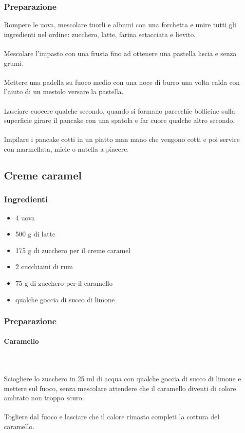 \documentclass[12pt, a4paper]{article}
\begin{document}
\subsubsection{Preparazione}
	Rompere le uova, mescolare tuorli e albumi con una forchetta e unire
	tutti gli ingredienti nel ordine: zucchero, latte, farina setacciata 
	e lievito.\\\\
	Mescolare l'impasto con una frusta fino ad ottenere una pastella
	liscia e senza grumi.\\\\
	Mettere una padella su fuoco medio con una noce di burro una volta
	calda con l'aiuto di un mestolo versare la pastella.\\\\
	Lasciare cuocere qualche secondo, quando si formano parecchie
	bollicine sulla superficie girare il pancake con una spatola
	e far cuore qualche altro secondo.\\\\
	Impilare i pancake cotti in un piatto man mano che vengono cotti e poi
	servire con marmellata, miele o nutella a piacere.
\clearpage

\subsection{Creme caramel}

\subsubsection{Ingredienti}
\begin{itemize}
\item   4 uova
\item	500 g di latte
\item	175 g di zucchero per il creme caramel
\item	2 cucchiaini di rum
\item	75 g di zucchero per il caramello
\item	qualche goccia di succo di limone
\end{itemize}

\subsubsection{Preparazione}
	\paragraph{Caramello}\mbox{}\\\\
	Sciogliere lo zucchero in 25 ml di acqua con qualche goccia di succo di limone
	e mettere sul fuoco, senza mescolare attendere che il caramello diventi di colore
	ambrato non troppo scuro.\\\\
	Togliere dal fuoco e lasciare che il calore rimasto 
	completi la cottura del caramello.
\end{document}
